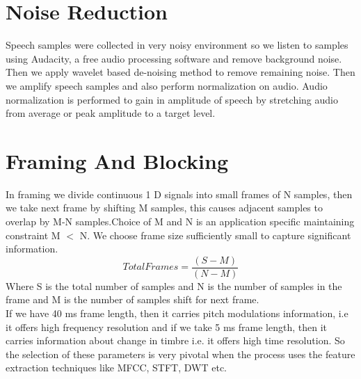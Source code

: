 \documentclass[11pt]{report}
\begin{document}
\section{Noise Reduction}
Speech samples were collected in very noisy environment so we listen to samples using Audacity, a free audio processing software and remove background noise. Then we apply wavelet based de-noising method to remove remaining noise.
Then we amplify speech samples and also perform normalization on audio. Audio normalization is performed to gain in amplitude of speech by stretching audio from average or peak amplitude to a target level.


\section{Framing And Blocking}
In framing we divide continuous 1 D signals into small frames of N samples, then we take next frame by shifting M samples, this causes adjacent samples to overlap by M-N samples.Choice of M and N is an application specific maintaining constraint M $<$ N. We choose frame size sufficiently small to capture significant information.\\
\begin{equation}
TotalFrames= \frac{(S-M)}{(N-M)}
\end{equation}
Where S is the total number of samples and N is the number of samples in the frame and M is the number of samples shift for next frame.\\
If we have 40 ms frame length, then it carries pitch modulations information, i.e it offers high frequency resolution and if we take 5 ms frame length, then it carries information about change in timbre i.e. it offers high time resolution. So the selection of these parameters is very pivotal when the process uses the feature extraction techniques  like MFCC, STFT, DWT etc.  \\
\end{document}

